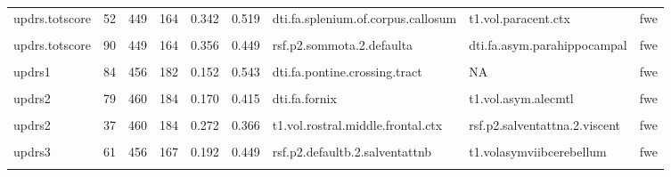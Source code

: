\documentclass[
  table]{article}
\begin{document}
\begin{landscape}
\begin{table}
\begin{tabular}[t]{llrrrrlll}
updrs.totscore & 52 & 449 & 164 & 0.342 & 0.519 & dti.fa.splenium.of.corpus.callosum & t1.vol.paracent.ctx & fwe\\
\addlinespace
\cellcolor{gray!22}{updrs.totscore} & \cellcolor{gray!22}{61} & \cellcolor{gray!22}{449} & \cellcolor{gray!22}{164} & \cellcolor{gray!22}{0.211} & \cellcolor{gray!22}{0.480} & \cellcolor{gray!22}{rsf.p2.defaultb.2.salventattnb} & \cellcolor{gray!22}{dti.fa.asym.paracent} & \cellcolor{gray!22}{fwe}\\
updrs.totscore & 90 & 449 & 164 & 0.356 & 0.449 & rsf.p2.sommota.2.defaulta & dti.fa.asym.parahippocampal & fwe\\
\cellcolor{gray!22}{updrs1} & \cellcolor{gray!22}{89} & \cellcolor{gray!22}{456} & \cellcolor{gray!22}{182} & \cellcolor{gray!22}{0.137} & \cellcolor{gray!22}{0.576} & \cellcolor{gray!22}{dti.fa.pontine.crossing.tract} & \cellcolor{gray!22}{rsf.p2.defaultb.2.limbicb} & \cellcolor{gray!22}{fwe}\\
updrs1 & 84 & 456 & 182 & 0.152 & 0.543 & dti.fa.pontine.crossing.tract & NA & fwe\\
\cellcolor{gray!22}{updrs1} & \cellcolor{gray!22}{58} & \cellcolor{gray!22}{456} & \cellcolor{gray!22}{182} & \cellcolor{gray!22}{0.092} & \cellcolor{gray!22}{0.602} & \cellcolor{gray!22}{dti.fa.corticospinal.tract} & \cellcolor{gray!22}{NA} & \cellcolor{gray!22}{fwe}\\
\addlinespace
updrs2 & 79 & 460 & 184 & 0.170 & 0.415 & dti.fa.fornix & t1.vol.asym.alecmtl & fwe\\
\cellcolor{gray!22}{updrs2} & \cellcolor{gray!22}{16} & \cellcolor{gray!22}{460} & \cellcolor{gray!22}{184} & \cellcolor{gray!22}{0.214} & \cellcolor{gray!22}{0.313} & \cellcolor{gray!22}{rsf.p2.citlimbic.2.temppar} & \cellcolor{gray!22}{NA} & \cellcolor{gray!22}{fdr}\\
updrs2 & 37 & 460 & 184 & 0.272 & 0.366 & t1.vol.rostral.middle.frontal.ctx & rsf.p2.salventattna.2.viscent & fwe\\
\cellcolor{gray!22}{updrs3} & \cellcolor{gray!22}{52} & \cellcolor{gray!22}{456} & \cellcolor{gray!22}{167} & \cellcolor{gray!22}{0.423} & \cellcolor{gray!22}{0.497} & \cellcolor{gray!22}{dti.fa.splenium.of.corpus.callosum} & \cellcolor{gray!22}{t1.vol.paracent.ctx} & \cellcolor{gray!22}{fwe}\\
updrs3 & 61 & 456 & 167 & 0.192 & 0.449 & rsf.p2.defaultb.2.salventattnb & t1.volasymviibcerebellum & fwe\\
\addlinespace
\cellcolor{gray!22}{updrs3} & \cellcolor{gray!22}{90} & \cellcolor{gray!22}{456} & \cellcolor{gray!22}{167} & \cellcolor{gray!22}{0.321} & \cellcolor{gray!22}{0.468} & \cellcolor{gray!22}{rsf.p2.sommota.2.defaulta} & \cellcolor{gray!22}{dti.fa.asym.parahippocampal} & \cellcolor{gray!22}{fwe}\\
\bottomrule
\end{tabular}
\end{table}
\end{landscape}
\end{document}
